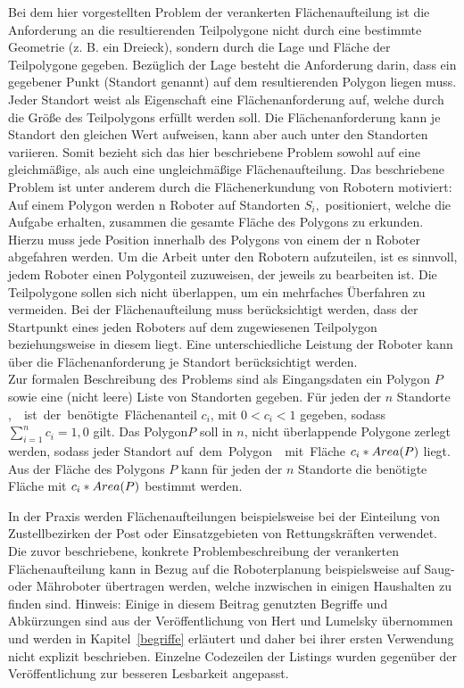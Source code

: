 \documentclass[ngerman]{seminarbeitrag}
\begin{document}
Bei dem hier vorgestellten Problem der verankerten Flächenaufteilung ist die Anforderung an die resultierenden Teilpolygone nicht durch eine bestimmte Geometrie
(z. B. ein Dreieck), sondern durch die Lage und Fläche der Teilpolygone gegeben. Bezüglich der Lage besteht die Anforderung darin, dass ein gegebener Punkt (Standort genannt) auf
dem resultierenden Polygon liegen muss. Jeder Standort weist als Eigenschaft eine Flächenanforderung auf, welche durch die Größe des Teilpolygons erfüllt werden soll. Die
Flächenanforderung kann je Standort den gleichen Wert aufweisen, kann aber auch unter den Standorten variieren. Somit bezieht sich das hier beschriebene Problem sowohl auf eine
gleichmäßige, als auch eine ungleichmäßige Flächenaufteilung. Das beschriebene Problem ist unter anderem durch die Flächenerkundung von Robotern motiviert: \\

Auf einem Polygon werden n Roboter auf Standorten $S_{i},$ \iton positioniert, welche die Aufgabe erhalten, zusammen die gesamte Fläche des Polygons zu
erkunden. Hierzu muss jede Position innerhalb des Polygons von einem der n Roboter abgefahren werden. Um die Arbeit unter den Robotern aufzuteilen, ist es sinnvoll, jedem Roboter einen Polygonteil zuzuweisen, der jeweils zu bearbeiten ist. Die Teilpolygone sollen sich nicht überlappen, um ein mehrfaches Überfahren zu vermeiden. Bei der Flächenaufteilung muss berücksichtigt werden, dass der Startpunkt eines jeden Roboters auf dem zugewiesenen Teilpolygon beziehungsweise in diesem liegt. Eine unterschiedliche Leistung der Roboter kann über die Flächenanforderung je Standort berücksichtigt werden. \\

Zur formalen Beschreibung des Problems sind als Eingangsdaten ein Polygon $P$ sowie eine (nicht leere) Liste von Standorten  gegeben. Für jeden der $n$
Standorte \si, \iton ist der benötigte Flächenanteil $c_{i}$, \iton mit $0 < c_{i} < 1$ gegeben, sodass $\sum_{i=1}^{n}c_{i}=1,0$ gilt. Das Polygon$P$ soll in $n$, nicht
überlappende Polygone zerlegt werden, sodass jeder Standort \si auf dem Polygon \pi mit Fläche $c_{i}* Area(P)$ liegt. Aus der Fläche des Polygons $P$ kann für jeden der $n$ Standorte die benötigte Fläche mit $c_{i}* Area(P)$ bestimmt werden.

In der Praxis werden Flächenaufteilungen beispielsweise bei der Einteilung von Zustellbezirken der Post oder Einsatzgebieten von Rettungskräften verwendet. Die zuvor beschriebene, konkrete Problembeschreibung der verankerten Flächenaufteilung kann in Bezug auf die Roboterplanung beispielsweise auf Saug- oder Mähroboter übertragen werden, welche inzwischen in einigen Haushalten zu finden sind. 
Hinweis: Einige in diesem Beitrag genutzten Begriffe und Abkürzungen sind aus der Veröffentlichung von Hert und Lumelsky \cite{Hert.1998} übernommen und werden in Kapitel~\ref{begriffe} erläutert und daher bei ihrer ersten Verwendung nicht explizit beschrieben. Einzelne Codezeilen der Listings wurden gegenüber der Veröffentlichung \cite{Hert.1998} zur besseren Lesbarkeit angepasst.
\end{document}
